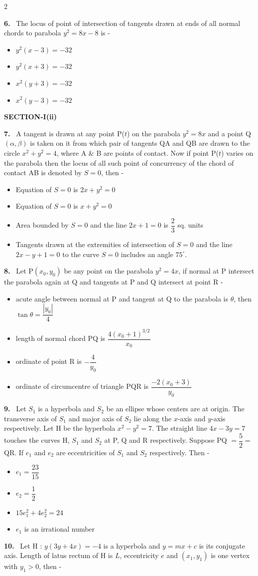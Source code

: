 \documentclass[10pt]{extarticle}
\newcommand{\sect}[1]{\par\smallskip\noindent\textbf{#1}\par}
\newcommand{\qn}[1]{\par\smallskip\noindent\textbf{#1.}~}
\newenvironment{qoptions}{\begin{itemize}[leftmargin=1.8em,itemsep=1pt,topsep=2pt,label={}]}{\end{itemize}}
\newcommand{\opt}[2]{\item[(#1)] #2}
\begin{document}
\begin{multicols}{2}
\qn{6} The locus of point of intersection of tangents drawn at ends of all normal chords to parabola $y^2=8x-8$ is -
\begin{qoptions}
\opt{A}{$y^2(x-3)=-32$}
\opt{B}{$y^2(x+3)=-32$}
\opt{C}{$x^2(y+3)=-32$}
\opt{D}{$x^2(y-3)=-32$}
\end{qoptions}
\sect{SECTION-I(ii)}
\qn{7} A tangent is drawn at any point P($t$) on the parabola $y^2=8x$ and a point Q$(\alpha,\beta)$ is taken on it from which pair of tangents QA and QB are drawn to the circle $x^2+y^2=4$, where A \& B are points of contact. Now if point P($t$) varies on the parabola then the locus of all such point of concurrency of the chord of contact AB is denoted by $S=0$, then -
\begin{qoptions}
\opt{A}{Equation of $S=0$ is $2x+y^2=0$}
\opt{B}{Equation of $S=0$ is $x+y^2=0$}
\opt{C}{Area bounded by $S=0$ and the line $2x+1=0$ is $\dfrac23$ sq. units}
\opt{D}{Tangents drawn at the extremities of intersection of $S=0$ and the line $2x-y+1=0$ to the curve $S=0$ includes an angle $75^\circ$.}
\end{qoptions}
\qn{8} Let P$(x_0,y_0)$ be any point on the parabola $y^2=4x$, if normal at P intersect the parabola again at Q and tangents at P and Q intersect at point R -
\begin{qoptions}
\opt{A}{acute angle between normal at P and tangent at Q to the parabola is $\theta$, then $\tan\theta=\dfrac{|y_0|}{4}$}
\opt{B}{length of normal chord PQ is $\dfrac{4(x_0+1)^{3/2}}{x_0}$}
\opt{C}{ordinate of point R is $-\dfrac{4}{y_0}$}
\opt{D}{ordinate of circumcentre of triangle PQR is $\dfrac{-2(x_0+3)}{y_0}$}
\end{qoptions}
\qn{9} Let $S_1$ is a hyperbola and $S_2$ be an ellipse whose centers are at origin. The transverse axis of $S_1$ and major axis of $S_2$ lie along the $x$-axis and $y$-axis respectively. Let H be the hyperbola $x^2-y^2=7$. The straight line $4x-3y=7$ touches the curves H, $S_1$ and $S_2$ at P, Q and R respectively. Suppose PQ $=\dfrac52=$ QR. If $e_1$ and $e_2$ are eccentricities of $S_1$ and $S_2$ respectively. Then -
\begin{qoptions}
\opt{A}{$e_1=\dfrac{23}{15}$}
\opt{B}{$e_2=\dfrac12$}
\opt{C}{$15e_1^2+4e_2^2=24$}
\opt{D}{$e_1$ is an irrational number}
\end{qoptions}
\qn{10} Let H : $y(3y+4x)=-4$ is a hyperbola and $y=mx+c$ is its conjugate axis. Length of latus rectum of H is $L$, eccentricity $e$ and $(x_1,y_1)$ is one vertex with $y_1>0$, then -
\begin{qoptions}

\end{qoptions}
\end{multicols}
\end{document}
